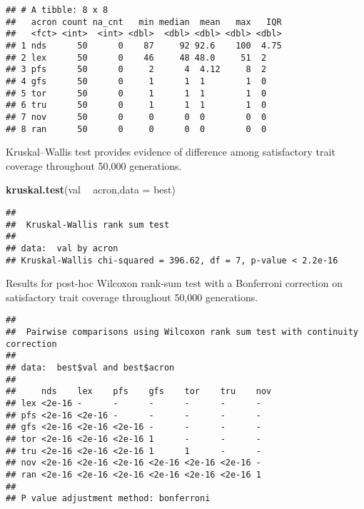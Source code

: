 \documentclass[]{book}
\newenvironment{Shaded}{\begin{snugshade}}{\end{snugshade}}
\newcommand{\DataTypeTok}[1]{\textcolor[rgb]{0.13,0.29,0.53}{#1}}
\newcommand{\KeywordTok}[1]{\textcolor[rgb]{0.13,0.29,0.53}{\textbf{#1}}}
\newcommand{\NormalTok}[1]{#1}
\newcommand{\OperatorTok}[1]{\textcolor[rgb]{0.81,0.36,0.00}{\textbf{#1}}}
\newcommand{\OtherTok}[1]{\textcolor[rgb]{0.56,0.35,0.01}{#1}}
\newcommand{\StringTok}[1]{\textcolor[rgb]{0.31,0.60,0.02}{#1}}
\begin{document}
\begin{verbatim}
## # A tibble: 8 x 8
##   acron count na_cnt   min median  mean   max   IQR
##   <fct> <int>  <int> <dbl>  <dbl> <dbl> <dbl> <dbl>
## 1 nds      50      0    87     92 92.6    100  4.75
## 2 lex      50      0    46     48 48.0     51  2   
## 3 pfs      50      0     2      4  4.12     8  2   
## 4 gfs      50      0     1      1  1        1  0   
## 5 tor      50      0     1      1  1        1  0   
## 6 tru      50      0     1      1  1        1  0   
## 7 nov      50      0     0      0  0        0  0   
## 8 ran      50      0     0      0  0        0  0
\end{verbatim}

Kruskal--Wallis test provides evidence of difference among satisfactory trait coverage throughout 50,000 generations.

\begin{Shaded}
\begin{Highlighting}[]
\KeywordTok{kruskal.test}\NormalTok{(val }\OperatorTok{~}\StringTok{ }\NormalTok{acron,}\DataTypeTok{data =}\NormalTok{ best)}
\end{Highlighting}
\end{Shaded}

\begin{verbatim}
## 
##  Kruskal-Wallis rank sum test
## 
## data:  val by acron
## Kruskal-Wallis chi-squared = 396.62, df = 7, p-value < 2.2e-16
\end{verbatim}

Results for post-hoc Wilcoxon rank-sum test with a Bonferroni correction on satisfactory trait coverage throughout 50,000 generations.

\begin{Shaded}
\end{Shaded}

\begin{verbatim}
## 
##  Pairwise comparisons using Wilcoxon rank sum test with continuity correction 
## 
## data:  best$val and best$acron 
## 
##     nds    lex    pfs    gfs    tor    tru    nov
## lex <2e-16 -      -      -      -      -      -  
## pfs <2e-16 <2e-16 -      -      -      -      -  
## gfs <2e-16 <2e-16 <2e-16 -      -      -      -  
## tor <2e-16 <2e-16 <2e-16 1      -      -      -  
## tru <2e-16 <2e-16 <2e-16 1      1      -      -  
## nov <2e-16 <2e-16 <2e-16 <2e-16 <2e-16 <2e-16 -  
## ran <2e-16 <2e-16 <2e-16 <2e-16 <2e-16 <2e-16 1  
## 
## P value adjustment method: bonferroni
\end{verbatim}
\end{document}
